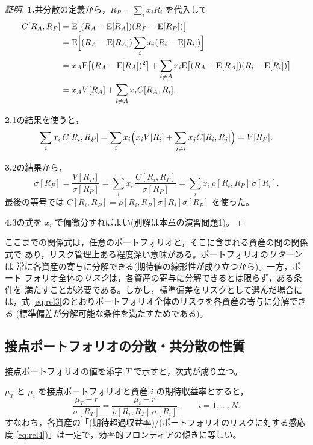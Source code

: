 \begin{proof}[証明]
\textbf{1.}共分散の定義から，$R_P = \sum_i x_i R_i$ を代入して
\begin{align*}
C[R_A, R_P] &= \mathrm{E}\bigl[(R_A - \mathrm{E}[R_A])(R_P - \mathrm{E}[R_P])\bigr]\\
&= \mathrm{E}\Bigl[(R_A-\mathrm{E}[R_A])\sum_i x_i(R_i - \mathrm{E}[R_i])\Bigr]\\
&= x_A\mathrm{E}\bigl[(R_A-\mathrm{E}[R_A])^2\bigr]
+ \sum_{i\neq A}x_i\mathrm{E}\bigl[(R_A-\mathrm{E}[R_A])(R_i-\mathrm{E}[R_i])\bigr]\\
&= x_A V[R_A] + \sum_{i\neq A}x_i C[R_A,R_i].
\end{align*}

\textbf{2.}1の結果を使うと，
\[
\sum_i x_i\,C[R_i,R_P]
= \sum_i x_i\Bigl(x_i V[R_i] + \sum_{j\neq i}x_j C[R_i,R_j]\Bigr)
= V[R_P].
\]

\textbf{3.}2の結果から，
\[
\sigma[R_P] = \frac{V[R_P]}{\sigma[R_P]}
= \sum_i x_i\,\frac{C[R_i,R_P]}{\sigma[R_P]}
= \sum_i x_i\,\rho[R_i,R_P]\,\sigma[R_i].
\]
最後の等号では $C[R_i,R_P] = \rho[R_i,R_P]\sigma[R_i]\sigma[R_P]$ を使った。

\textbf{4.}3の式を $x_i$ で偏微分すればよい(別解は本章の演習問題1)。
\end{proof}

\begin{remark}[リスク分解の意味]
ここまでの関係式は，任意のポートフォリオと，そこに含まれる資産の間の関係式で
あり，リスク管理上ある程度深い意味がある。ポートフォリオの\emph{リターン}は
常に各資産の寄与に分解できる(期待値の線形性が成り立つから)。一方，ポート
フォリオ全体の\emph{リスク}は，各資産の寄与に分解できるとは限らず，ある条件を
満たすことが必要である。しかし，標準偏差をリスクとして選んだ場合には，式
\eqref{eq:rel3}のとおりポートフォリオ全体のリスクを各資産の寄与に分解できる
(標準偏差が分解可能な条件を満たすためである)。
\end{remark}

\vspace{18pt}

\subsection{接点ポートフォリオの分散・共分散の性質}

接点ポートフォリオの値を添字 $T$ で示すと，次式が成り立つ。

\begin{theorem}[接点ポートフォリオの性質]
$\mu_T$ と $\mu_i$ を接点ポートフォリオと資産 $i$ の期待収益率とすると，
\begin{equation}
\frac{\mu_T - r}{\sigma[R_T]}
= \frac{\mu_i - r}{\rho[R_i,R_T]\,\sigma[R_i]},
\qquad i = 1,\dots,N.
\label{eq:tangent-property}
\end{equation}
すなわち，各資産の「(期待超過収益率)/(ポートフォリオのリスクに対する感応度
\eqref{eq:rel4})」は一定で，効率的フロンティアの傾きに等しい。
\end{theorem}

